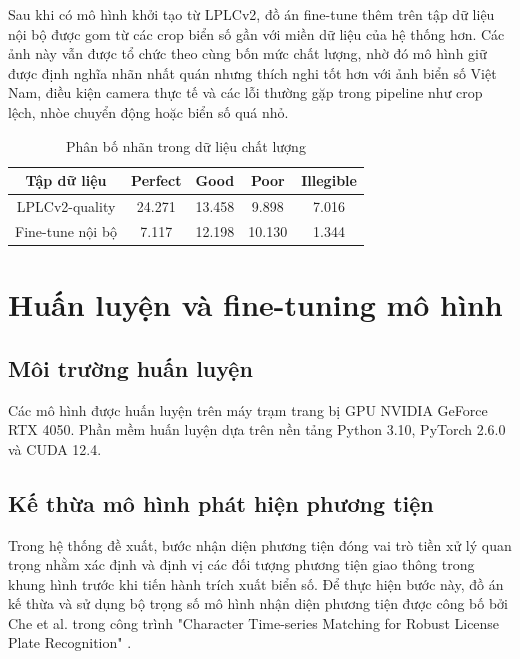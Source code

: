\documentclass[../DoAn.tex]{subfiles}
\begin{document}
Sau khi có mô hình khởi tạo từ LPLCv2, đồ án fine-tune thêm trên tập dữ liệu nội bộ được gom từ các crop biển số gần với miền dữ liệu của hệ thống hơn. Các ảnh này vẫn được tổ chức theo cùng bốn mức chất lượng, nhờ đó mô hình giữ được định nghĩa nhãn nhất quán nhưng thích nghi tốt hơn với ảnh biển số Việt Nam, điều kiện camera thực tế và các lỗi thường gặp trong pipeline như crop lệch, nhòe chuyển động hoặc biển số quá nhỏ.

\begin{table}[htbp]
\centering
\caption{Phân bố nhãn trong dữ liệu chất lượng}
\begin{tabular}{|c|c|c|c|c|}
\hline
Tập dữ liệu & Perfect & Good & Poor & Illegible \\
\hline
LPLCv2-quality & 24.271 & 13.458 & 9.898 & 7.016 \\
Fine-tune nội bộ & 7.117 & 12.198 & 10.130 & 1.344 \\
\hline
\end{tabular}
\end{table}

\vspace{-1em}



\section{Huấn luyện và fine-tuning mô hình}
\label{section:4.2_training}

\subsection{Môi trường huấn luyện}
\label{subsection:4.2.1_env}
Các mô hình được huấn luyện trên máy trạm trang bị GPU NVIDIA GeForce RTX 4050. Phần mềm huấn luyện dựa trên nền tảng Python 3.10, PyTorch 2.6.0 và CUDA 12.4. 
\subsection{Kế thừa mô hình phát hiện phương tiện}
\label{subsection:4.2.2_vehicle}

Trong hệ thống đề xuất, bước nhận diện phương tiện đóng vai trò tiền xử lý quan trọng nhằm xác định và định vị các đối tượng phương tiện giao thông trong khung hình trước khi tiến hành trích xuất biển số. Để thực hiện bước này, đồ án kế thừa và sử dụng bộ trọng số mô hình nhận diện phương tiện được công bố bởi Che et al. trong công trình "Character Time-series Matching for Robust License Plate Recognition" \cite{che2023ctm}.
\end{document}
